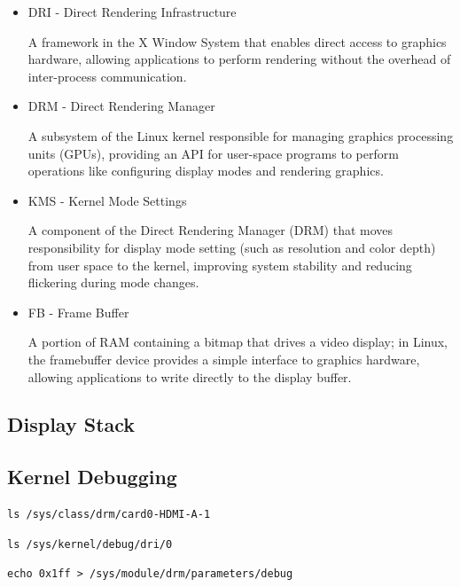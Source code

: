 \documentclass[11pt]{article}
\begin{document}
\begin{itemize}
    \item DRI - Direct Rendering Infrastructure

        A framework in the X Window System that enables direct access to
        graphics hardware, allowing applications to perform rendering without
        the overhead of inter-process communication.

    \item DRM - Direct Rendering Manager

        A subsystem of the Linux kernel responsible for managing graphics
        processing units (GPUs), providing an API for user-space programs to
        perform operations like configuring display modes and rendering
        graphics.

    \item KMS - Kernel Mode Settings

        A component of the Direct Rendering Manager (DRM) that moves
        responsibility for display mode setting (such as resolution and color
        depth) from user space to the kernel, improving system stability and
        reducing flickering during mode changes.

    \item FB - Frame Buffer

        A portion of RAM containing a bitmap that drives a video display; in
        Linux, the framebuffer device provides a simple interface to graphics
        hardware, allowing applications to write directly to the display
        buffer.
\end{itemize}

\subsection{Display Stack}

\subsection{Kernel Debugging}

\begin{verbatim}
ls /sys/class/drm/card0-HDMI-A-1
\end{verbatim}

\begin{verbatim}
ls /sys/kernel/debug/dri/0
\end{verbatim}

\begin{verbatim}
echo 0x1ff > /sys/module/drm/parameters/debug
\end{verbatim}
\end{document}
